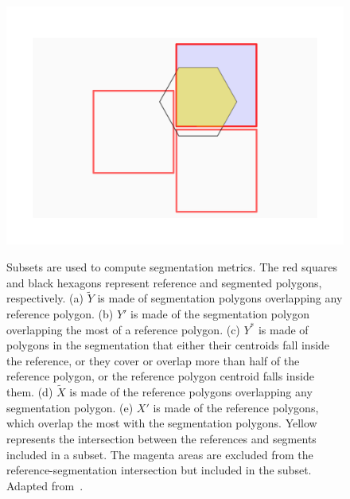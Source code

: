 \begin{figure}[!ht]
    {\includegraphics[trim=20 25 20 25, clip, width=.3\textwidth]{fig1e.png}}
    \caption{Subsets are used to compute segmentation metrics. The red squares and black hexagons represent reference and segmented polygons, respectively. (a) $\tilde{Y}$ is made of segmentation polygons overlapping any reference polygon. (b) $Y'$ is made of the segmentation polygon overlapping the most of a reference polygon. (c) ${Y}^{*}$ is made of polygons in the segmentation that either their centroids fall inside the reference, or they cover or overlap more than half of the reference polygon, or the reference polygon centroid falls inside them. (d) $\tilde{X}$ is made of the reference polygons overlapping any segmentation polygon. (e) $X'$ is made of the reference polygons, which overlap the most with the segmentation polygons. Yellow represents the intersection between the references and segments included in a subset. The magenta areas are excluded from the reference-segmentation intersection but included in the subset. Adapted from~\citet{Jozdani2020}.}
    \label{fig:subsets}
\end{figure}

